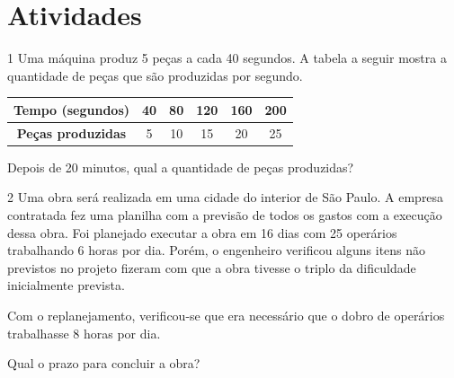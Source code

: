 \section*{Atividades}

\num{1} Uma máquina produz 5 peças a cada 40 segundos. A tabela a seguir
mostra a quantidade de peças que são produzidas por segundo.

\begin{center}
\begin{tabular}{|c ccccc|}
\hline
\textbf{Tempo (segundos)} & 40 & 80 & 120 & 160 & 200 \\ \hline
\textbf{Peças produzidas} & 5 & 10 & 15 & 20 & 25 \\ \hline
\end{tabular}
\end{center}

Depois de 20 minutos, qual a quantidade de peças produzidas?

\begin{emptybox}
\end{emptybox}

\num{2} Uma obra será realizada em uma cidade do interior de São Paulo. A
empresa contratada fez uma planilha com a previsão de todos os gastos
com a execução dessa obra. Foi planejado executar a obra em 16 dias com
25 operários trabalhando 6 horas por dia. Porém, o engenheiro verificou
alguns itens não previstos no projeto fizeram com que a obra tivesse o
triplo da dificuldade inicialmente prevista.

Com o replanejamento, verificou-se que era necessário que o dobro de
operários trabalhasse 8 horas por dia.

Qual o prazo para concluir a obra?

\begin{emptybox}
\end{emptybox}

